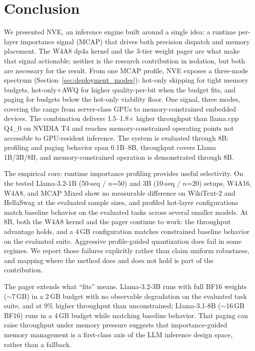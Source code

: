 \documentclass{article}
\begin{document}
\section{Conclusion}
\label{sec:conclusion}

We presented NVE, an inference engine built around a single idea: a runtime
per-layer importance signal (MCAP) that drives both precision dispatch and
memory placement. The W4A8 dp4a kernel and the 3-tier weight pager are what
make that signal actionable; neither is the research contribution in isolation,
but both are necessary for the result. From one MCAP profile, NVE exposes a
three-mode spectrum (Section~\ref{sec:deployment_modes}): hot-only skipping for
tight memory budgets, hot-only+AWQ for higher quality-per-bit when the budget
fits, and paging for budgets below the hot-only viability floor. One signal,
three modes, covering the range from server-class GPUs to memory-constrained
embedded devices. The combination delivers 1.5--1.8$\times$ higher throughput
than llama.cpp Q4\_0 on NVIDIA T4 and reaches memory-constrained operating
points not accessible to GPU-resident inference. The system is evaluated
through 8B: profiling and paging behavior span 0.1B--8B, throughput covers
Llama 1B/3B/8B, and memory-constrained operation is demonstrated through 8B.

The empirical core: runtime importance profiling provides useful selectivity.
On the tested Llama-3.2-1B (50-seq / $n$=50) and 3B (10-seq / $n$=20) setups,
W4A16, W4A8, and MCAP Mixed show no measurable difference on WikiText-2 and
HellaSwag at the evaluated sample sizes, and profiled hot-layer configurations
match baseline behavior on the evaluated tasks across several smaller models.
At 8B, both the W4A8 kernel and the pager continue to work: the throughput
advantage holds, and a 4\,GB configuration matches constrained baseline
behavior on the evaluated suite.
Aggressive profile-guided quantization does fail in some regimes. We report
those failures explicitly rather than claim uniform robustness, and mapping
where the method does and does not hold is part of the contribution.

The pager extends what ``fits'' means. Llama-3.2-3B runs with full BF16
weights ($\sim$7\,GB) in a 2\,GB budget with no observable degradation on
the evaluated task suite, and at 9\% higher throughput than unconstrained;
Llama-3.1-8B
($\sim$16\,GB BF16) runs in a 4\,GB budget while matching baseline behavior.
That paging can raise throughput under memory pressure suggests that
importance-guided memory management is a first-class axis of the LLM inference
design space, rather than a fallback.
\end{document}
